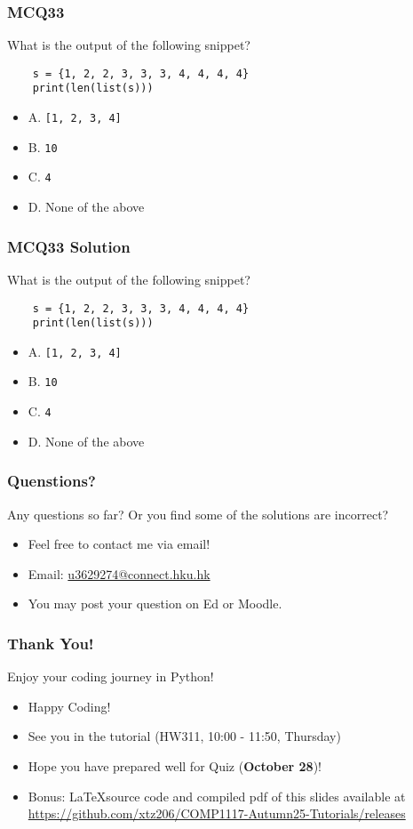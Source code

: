 \documentclass{beamer}
\begin{document}
\begin{frame}[fragile]
    \frametitle{MCQ33}
    What is the output of the following snippet?
    \begin{verbatim}
    s = {1, 2, 2, 3, 3, 3, 4, 4, 4, 4}
    print(len(list(s)))
    \end{verbatim}
    \begin{itemize}
        \item A. \texttt{[1, 2, 3, 4]}
        \item B. \texttt{10}
        \item C. \texttt{4}
        \item D. None of the above
    \end{itemize}
\end{frame}
\begin{frame}[fragile]
    \frametitle{MCQ33 Solution}
    What is the output of the following snippet?
    \begin{verbatim}
    s = {1, 2, 2, 3, 3, 3, 4, 4, 4, 4}
    print(len(list(s)))
    \end{verbatim}
    \begin{itemize}
        \item A. \texttt{[1, 2, 3, 4]}
        \item B. \texttt{10}
        \item \alert{C. \texttt{4}}
        \item D. None of the above
    \end{itemize}
\end{frame}

\begin{frame}
    \frametitle{Quenstions?}
    Any questions so far? Or you find some of the solutions are incorrect?
    \begin{itemize}
        \item Feel free to contact me via email!
        \item Email: \href{mailto:u3629274@connect.hku.hk}{u3629274@connect.hku.hk}
        \item You may post your question on Ed or Moodle.
    \end{itemize}
\end{frame}

\begin{frame}
    \frametitle{Thank You!}

    Enjoy your coding journey in Python!

    \begin{itemize}
        \item Happy Coding!
        \item See you in the tutorial (HW311, 10:00 - 11:50, Thursday)
        \item Hope you have prepared well for Quiz (\textbf{October 28})!
        \item Bonus: \LaTeX source code and compiled pdf of this slides available at
              \href{https://github.com/xtz206/COMP1117-Autumn25-Tutorials/releases}
              {https://github.com/xtz206/COMP1117-Autumn25-Tutorials/releases}
    \end{itemize}
\end{frame}
\end{document}
